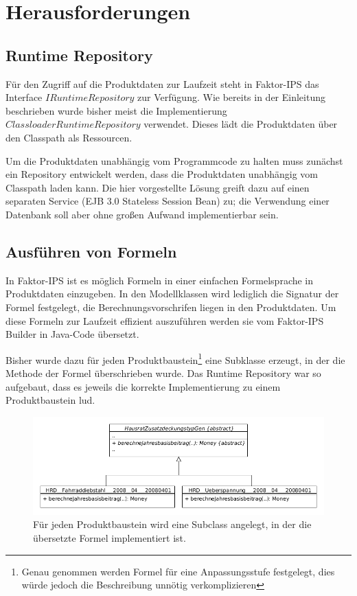 \documentclass[headsepline=true, footsepline=true]{scrartcl}
\begin{document}
\section{Herausforderungen}

\subsection{Runtime Repository}

Für den Zugriff auf die Produktdaten zur Laufzeit steht in Faktor-IPS das
Interface $IRuntimeRepository$ zur Verfügung. Wie bereits in der Einleitung
beschrieben wurde bisher meist die Implementierung
$ClassloaderRuntimeRepository$ verwendet. Dieses lädt die Produktdaten über den
Classpath als Ressourcen.

Um die Produktdaten unabhängig vom Programmcode zu halten muss zunächst ein
Repository entwickelt werden, dass die Produktdaten unabhängig vom Classpath
laden kann. Die hier vorgestellte Lösung greift dazu auf einen separaten Service
(EJB 3.0 Stateless Session Bean) zu; die Verwendung einer Datenbank soll aber
ohne großen Aufwand implementierbar sein.


\subsection{Ausführen von Formeln}

In Faktor-IPS ist es möglich Formeln in einer einfachen Formelsprache in
Produktdaten einzugeben. In den Modellklassen wird lediglich die Signatur der
Formel festgelegt, die Berechnungsvorschrifen liegen in den Produktdaten. Um
diese Formeln zur Laufzeit effizient auszuführen werden sie vom Faktor-IPS
Builder in Java-Code übersetzt.

Bisher wurde dazu für jeden Produktbaustein\footnote{Genau genommen werden
Formel für eine Anpassungsstufe festgelegt, dies würde jedoch die Beschreibung
unnötig verkomplizieren} eine Subklasse erzeugt, in der die Methode der Formel
überschrieben wurde. Das Runtime Repository war so aufgebaut, dass es jeweils die
korrekte Implementierung zu einem Produktbaustein lud.

\begin{figure}[htb] \centering
\includegraphics[width=13cm]{./pics/subclassing.png}
\caption{Für jeden Produktbaustein wird eine Subclass angelegt, in der die
übersetzte Formel implementiert ist.}
\label{subclassing}
\end{figure}
\end{document}
